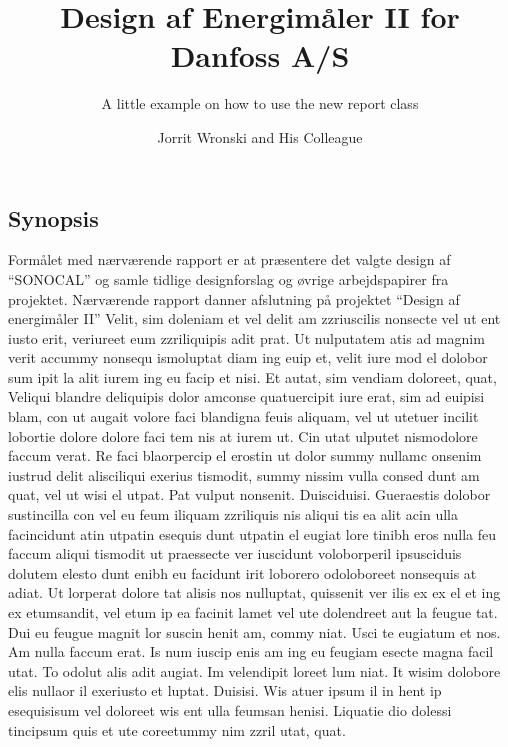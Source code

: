 \documentclass{ipureport}
\title{Design af Energimåler II for Danfoss A/S}
\subtitle{A little example on how to use the new report class}
\author{Jorrit Wronski and His Colleague}
\begin{document}

%


\maketitle

\begin{synopsis}%
\section*{Synopsis}
Formålet med nærværende rapport er at præsentere det valgte design af ``SONOCAL'' og samle tidlige
designforslag og øvrige arbejdspapirer fra projektet.
Nærværende rapport danner afslutning på projektet ``Design af energimåler II''
Velit, sim doleniam et vel delit am zzriuscilis nonsecte vel ut ent iusto erit, veriureet eum zzriliquipis
adit prat. Ut nulputatem atis ad magnim verit accummy nonsequ ismoluptat diam ing euip et, velit iure
mod el dolobor sum ipit la alit iurem ing eu facip et nisi. Et autat, sim vendiam doloreet, quat,
Veliqui blandre deliquipis dolor amconse quatuercipit iure erat, sim ad euipisi blam, con ut augait
volore faci blandigna feuis aliquam, vel ut utetuer incilit lobortie dolore dolore faci tem nis at iurem ut.
Cin utat ulputet nismodolore faccum verat. Re faci blaorpercip el erostin ut dolor summy nullamc
onsenim iustrud delit alisciliqui exerius tismodit, summy nissim vulla consed dunt am quat, vel ut
wisi el utpat. Pat vulput nonsenit.
Duisciduisi. Gueraestis dolobor sustincilla con vel eu feum iliquam zzriliquis nis aliqui tis ea alit acin
ulla facincidunt atin utpatin esequis dunt utpatin el eugiat lore tinibh eros nulla feu faccum aliqui
tismodit ut praessecte ver iuscidunt voloborperil ipsusciduis dolutem elesto dunt enibh eu facidunt
irit loborero odoloboreet nonsequis at adiat.
Ut lorperat dolore tat alisis nos nulluptat, quissenit ver ilis ex ex el et ing ex etumsandit, vel etum ip
ea facinit lamet vel ute dolendreet aut la feugue tat. Dui eu feugue magnit lor suscin henit am, commy
niat. Usci te eugiatum et nos.
Am nulla faccum erat. Is num iuscip enis am ing eu feugiam esecte magna facil utat. To odolut alis
adit augiat. Im velendipit loreet lum niat. It wisim dolobore elis nullaor il exeriusto et luptat. Duisisi.
Wis atuer ipsum il in hent ip esequisisum vel doloreet wis ent ulla feumsan henisi. Liquatie dio dolessi
tincipsum quis et ute coreetummy nim zzril utat, quat.

\end{synopsis}




\blinddocument



\blinddocument

\end{document}
